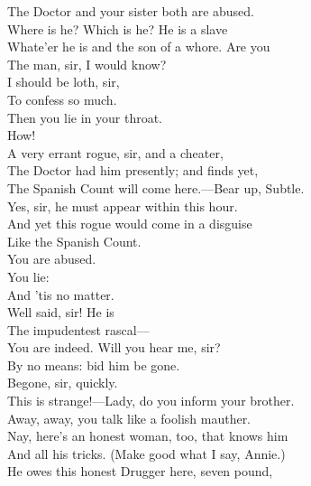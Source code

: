 \documentclass[a4paper,oneside,12pt]{memoir}
\begin{document}
\begin{drama*}
The Doctor and your sister both are abused.\\
\kastrilspeaks Where is he? Which is he? He is a slave\\
Whate'er he is and the son of a whore. Are you\\
The man, sir, I would know?\\
\surlyspeaks {} I should be loth, sir,\\
To confess so much.\\
\kastrilspeaks {} Then you lie in your throat.\\
\surlyspeaks {} How!\\
\facespeaks A very errant rogue, sir, and a cheater,\\
The Doctor had him presently; and finds yet,\\
The Spanish Count will come here.---Bear up, Subtle.\\
\subtlespeaks Yes, sir, he must appear within this hour.\\
\facespeaks And yet this rogue would come in a disguise\\
Like the Spanish Count.\\
\surlyspeaks {} You are abused.\\
\kastrilspeaks {} You lie:\\
And 'tis no matter.\\
\facespeaks {} Well said, sir! He is\\
The impudentest rascal---\\
\surlyspeaks {} You are indeed. Will you hear me, sir?\\
\facespeaks By no means: bid him be gone.\\
\kastrilspeaks {} Begone, sir, quickly.\\
\surlyspeaks This is strange!---Lady, do you inform your brother.\\
\kastrilspeaks Away, away, you talk like a foolish mauther.\\
\facespeaks Nay, here's an honest woman, too, that knows him\\
And all his tricks. (Make good what I say, Annie.)\\
He owes this honest Drugger here, seven pound,\\

\end{drama*}
\end{document}
